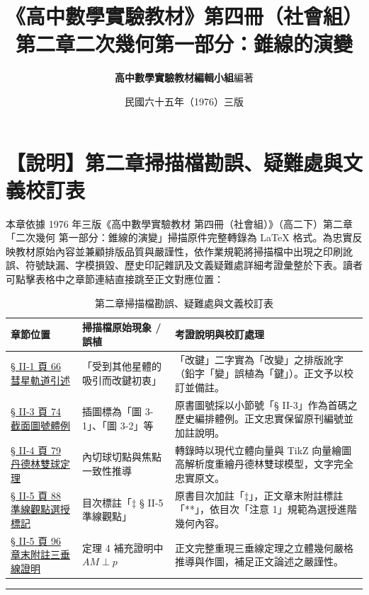 \documentclass[a4paper,12pt,twoside]{article}
\title{\LARGE\textbf{《高中數學實驗教材》第四冊（社會組）}\\[0.5em] \Large\textbf{第二章\quad 二次幾何\quad 第一部分：錐線的演變}}
\author{\textbf{高中數學實驗教材編輯小組}\quad 編著}
\date{民國六十五年（1976）三版}
\begin{document}
\maketitle
\thispagestyle{firstpage}

\section*{【說明】第二章掃描檔勘誤、疑難處與文義校訂表}
\label{sec:errata_notes_b4_ch2}
\label{sec:current_errata}

本章依據 1976 年三版《高中數學實驗教材 第四冊（社會組）》（高二下）第二章「二次幾何 第一部分：錐線的演變」掃描原件完整轉錄為 \LaTeX{} 格式。為忠實反映教材原始內容並兼顧排版品質與嚴謹性，依作業規範將掃描檔中出現之印刷訛誤、符號缺漏、字模損毀、歷史印記雜訊及文義疑難處詳細考證彙整於下表。讀者可點擊表格中之章節連結直接跳至正文對應位置：

\begin{table}[H]
\centering
\small
\renewcommand{\arraystretch}{1.35}
\begin{tabularx}{\textwidth}{|p{3.2cm}|p{3.8cm}|X|}
\hline
\textbf{章節位置} & \textbf{掃描檔原始現象 / 誤植} & \textbf{考證說明與校訂處理} \\ \hline

\hyperref[sec:b4s-2-1]{§ II-1 頁 66 彗星軌道引述} & 
「受到其他星體的吸引而改鍵初衷」 & 
「改鍵」二字實為「改變」之排版訛字（鉛字「變」誤植為「鍵」）。正文予以校訂並備註。 \\ \hline

\hyperref[sec:b4s-2-3]{§ II-3 頁 74 截面圖號體例} & 
插圖標為「圖 3-1」、「圖 3-2」等 & 
原書圖號採以小節號「§ II-3」作為首碼之歷史編排體例。正文忠實保留原刊編號並加註說明。 \\ \hline

\hyperref[sec:b4s-2-4]{§ II-4 頁 79 丹德林雙球定理} & 
內切球切點與焦點一致性推導 & 
轉錄時以現代立體向量與 TikZ 向量繪圖高解析度重繪丹德林雙球模型，文字完全忠實原文。 \\ \hline

\hyperref[sec:b4s-2-5]{§ II-5 頁 88 準線觀點選授標記} & 
目次標註「$\ddagger$ § II-5 準線觀點」 & 
原書目次加註「$\ddagger$」，正文章末附註標註「**」，依目次「注意 1」規範為選授進階幾何內容。 \\ \hline

\hyperref[note:b4s-ch2-p96-appendix-note]{§ II-5 頁 96 章末附註三垂線證明} & 
定理 4 補充證明中 $AM \perp p$ & 
正文完整重現三垂線定理之立體幾何嚴格推導與作圖，補足正文論述之嚴謹性。 \\ \hline

\end{tabularx}
\caption{第二章掃描檔勘誤、疑難處與文義校訂表}
\label{tab:errata_b4_ch2}
\end{table}

\vspace{1em}
\hrule
\vspace{1em}

\tableofcontents
\newpage


\end{document}
